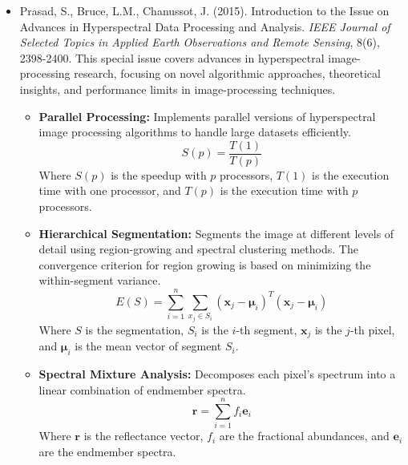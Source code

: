 \documentclass[10pt,svgnames,fragile]{beamer}
\begin{document}
\begin{frame}{}
\tiny
\begin{itemize}

    \item Prasad, S., Bruce, L.M., Chanussot, J. (2015). Introduction to the Issue on Advances in Hyperspectral Data Processing and Analysis. \textit{IEEE Journal of Selected Topics in Applied Earth Observations and Remote Sensing}, 8(6), 2398-2400. \href{https://consensus.app/papers/introduction-issue-advances-hyperspectral-data-prasad/350a2b44cc1a570f86f9e84aca539a5b/?utm_source=chatgpt}{\color{blue}{DOI: 10.1109/JSTARS.2015.2459631}}
    {\color{gray}This special issue covers advances in hyperspectral image-processing research, focusing on novel algorithmic approaches, theoretical insights, and performance limits in image-processing techniques.}
    \begin{itemize} \tiny
    \item \textbf{Parallel Processing:} Implements parallel versions of hyperspectral image processing algorithms to handle large datasets efficiently.
    \[
    S(p) = \frac{T(1)}{T(p)}
    \]
    Where \( S(p) \) is the speedup with \( p \) processors, \( T(1) \) is the execution time with one processor, and \( T(p) \) is the execution time with \( p \) processors.
    \item \textbf{Hierarchical Segmentation:} Segments the image at different levels of detail using region-growing and spectral clustering methods. The convergence criterion for region growing is based on minimizing the within-segment variance.
    \[
    E(S) = \sum_{i=1}^{n} \sum_{x_j \in S_i} (\mathbf{x}_j - \boldsymbol{\mu}_i)^T (\mathbf{x}_j - \boldsymbol{\mu}_i)
    \]
    Where \( S \) is the segmentation, \( S_i \) is the \( i \)-th segment, \( \mathbf{x}_j \) is the \( j \)-th pixel, and \( \boldsymbol{\mu}_i \) is the mean vector of segment \( S_i \).
    \item \textbf{Spectral Mixture Analysis:} Decomposes each pixel's spectrum into a linear combination of endmember spectra.
    \[
    \mathbf{r} = \sum_{i=1}^{n} f_i \mathbf{e}_i
    \]
    Where \( \mathbf{r} \) is the reflectance vector, \( f_i \) are the fractional abundances, and \( \mathbf{e}_i \) are the endmember spectra.
\end{itemize}
    
\end{itemize}
\end{frame}
\end{document}

